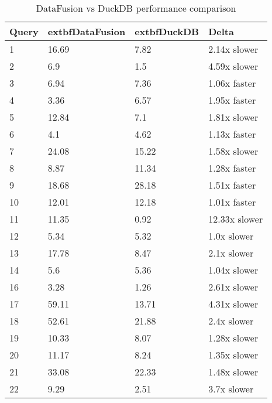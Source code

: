 \begin{table}[h]
\centering
\begin{tabular}{|l|l|l|l|}
\hline
Query & 	extbf{DataFusion} & 	extbf{DuckDB} & Delta \\
\hline
1 & 16.69 & 7.82 & 2.14x slower \\
\hline
2 & 6.9 & 1.5 & 4.59x slower \\
\hline
3 & 6.94 & 7.36 & 1.06x faster \\
\hline
4 & 3.36 & 6.57 & 1.95x faster \\
\hline
5 & 12.84 & 7.1 & 1.81x slower \\
\hline
6 & 4.1 & 4.62 & 1.13x faster \\
\hline
7 & 24.08 & 15.22 & 1.58x slower \\
\hline
8 & 8.87 & 11.34 & 1.28x faster \\
\hline
9 & 18.68 & 28.18 & 1.51x faster \\
\hline
10 & 12.01 & 12.18 & 1.01x faster \\
\hline
11 & 11.35 & 0.92 & 12.33x slower \\
\hline
12 & 5.34 & 5.32 & 1.0x slower \\
\hline
13 & 17.78 & 8.47 & 2.1x slower \\
\hline
14 & 5.6 & 5.36 & 1.04x slower \\
\hline
16 & 3.28 & 1.26 & 2.61x slower \\
\hline
17 & 59.11 & 13.71 & 4.31x slower \\
\hline
18 & 52.61 & 21.88 & 2.4x slower \\
\hline
19 & 10.33 & 8.07 & 1.28x slower \\
\hline
20 & 11.17 & 8.24 & 1.35x slower \\
\hline
21 & 33.08 & 22.33 & 1.48x slower \\
\hline
22 & 9.29 & 2.51 & 3.7x slower \\
\hline
\end{tabular}
\caption{DataFusion vs DuckDB performance comparison}
\label{table:1}
\end{table}